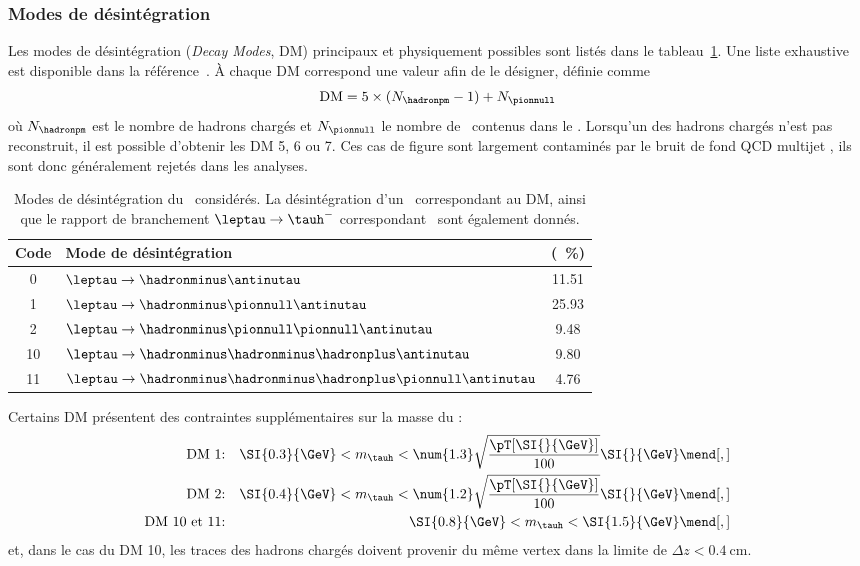 \subsubsection{Modes de désintégration}
Les modes de désintégration (\emph{Decay Modes}, DM) principaux et physiquement possibles sont listés dans le tableau~\ref{tab-tauh-DMs}.
Une liste exhaustive est disponible dans la référence~\cite{PDG_booklet_2020}.
À chaque DM correspond une valeur afin de le désigner, définie comme
\begin{equation}
\text{DM} = 5\times(N_{\hadronpm}-1) + N_{\pionnull}
\end{equation}
où $N_{\hadronpm}$ est le nombre de hadrons chargés et $N_{\pionnull}$ le nombre de \pionnull\ contenus dans le \tauh.
Lorsqu'un des hadrons chargés n'est pas reconstruit, il est possible d'obtenir les DM 5, 6 ou 7.
Ces cas de figure sont largement contaminés par le bruit de fond \og QCD multijet \fg, ils sont donc généralement rejetés dans les analyses.
\begin{table}[h]
\centering
\begin{tabular}{clc}
\toprule
Code & Mode de désintégration & \BR{} (\SI{}{\%})\\
\midrule
0 & $\leptau\to \hadronminus \antinutau$ & \num{11.51} \\
1 & $\leptau\to \hadronminus \pionnull \antinutau$ & \num{25.93} \\
2 & $\leptau\to \hadronminus \pionnull\pionnull \antinutau$ & \num{9.48} \\
10 & $\leptau\to \hadronminus \hadronminus\hadronplus \antinutau$ & \num{9.80} \\
11 & $\leptau\to \hadronminus \hadronminus\hadronplus\pionnull\antinutau$ & \num{4.76} \\
\bottomrule
\end{tabular}
\caption[Modes de désintégration du \tau\ considérés.]{Modes de désintégration du \tau\ considérés. La désintégration d'un \leptau\ correspondant au DM, ainsi que le rapport de branchement $\leptau\to\tauh^-$ correspondant~\cite{PDG_booklet_2020} sont également donnés.}
\label{tab-tauh-DMs}
\end{table}
\par
Certains DM présentent des contraintes supplémentaires sur la masse du \tauh:
\begin{align*}
\text{DM 1:} && \SI{0.3}{\GeV} < m_{\tauh} < \num{1.3}\sqrt{\frac{\pT[\SI{}{\GeV}]}{100}} \SI{}{\GeV}\mend[,]\\
\text{DM 2:} && \SI{0.4}{\GeV} < m_{\tauh} < \num{1.2}\sqrt{\frac{\pT[\SI{}{\GeV}]}{100}} \SI{}{\GeV}\mend[,]\\
\text{DM 10 et 11:} && \SI{0.8}{\GeV} < m_{\tauh} < \SI{1.5}{\GeV}\mend[,]\\
\end{align*}
et, dans le cas du DM 10, les traces des hadrons chargés doivent provenir du même vertex dans la limite de $\Delta z < \SI{0.4}{\centi\meter}$.
